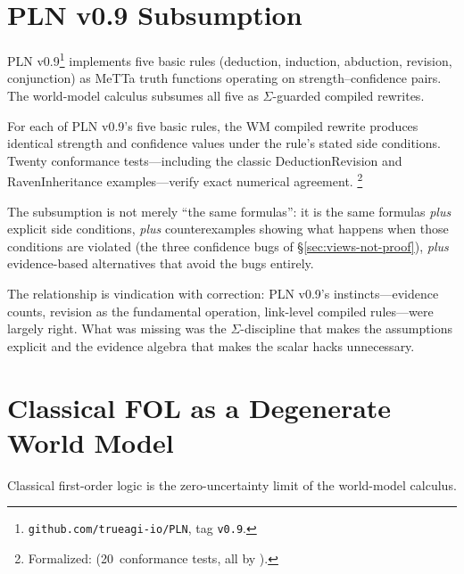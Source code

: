 \documentclass[11pt,openany]{report}
\begin{document}
\section{PLN v0.9 Subsumption}
\label{sec:bridge-pln09}

PLN v0.9\footnote{\texttt{github.com/trueagi-io/PLN}, tag
\texttt{v0.9}.} implements five basic rules (deduction, induction,
abduction, revision, conjunction) as MeTTa truth functions operating
on strength--confidence pairs.  The world-model calculus subsumes
all five as $\Sigma$-guarded compiled rewrites.

\begin{theorem}
\label{thm:pln09-conformance}
For each of PLN v0.9's five basic rules, the WM compiled rewrite
produces identical strength and confidence values under the
rule's stated side conditions.  Twenty conformance tests---including
the classic DeductionRevision and RavenInheritance
examples---verify exact numerical agreement.%
\footnote{Formalized:
(20~conformance tests, all by ).}
\end{theorem}

\noindent
The subsumption is not merely ``the same formulas'': it is the
same formulas \emph{plus} explicit side conditions, \emph{plus}
counterexamples showing what happens when those conditions are
violated (the three confidence bugs of \S\ref{sec:views-not-proof}),
\emph{plus} evidence-based alternatives that avoid the bugs entirely.

The relationship is vindication with correction: PLN v0.9's
instincts---evidence counts, revision as the fundamental operation,
link-level compiled rules---were largely right.  What was missing
was the $\Sigma$-discipline that makes the assumptions explicit and
the evidence algebra that makes the scalar hacks unnecessary.


\section{Classical FOL as a Degenerate World Model}
\label{sec:bridge-fol}

Classical first-order logic is the zero-uncertainty limit of the
world-model calculus.
\end{document}
